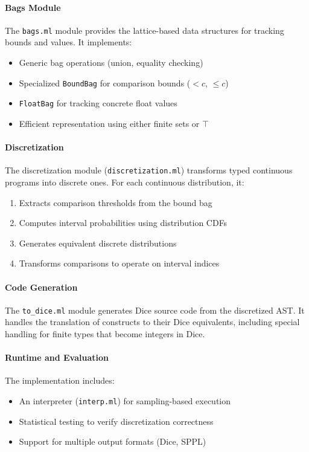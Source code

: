\paragraph{Bags Module} The \texttt{bags.ml} module provides the lattice-based data structures for tracking bounds and values. It implements:
\begin{itemize}
    \item Generic bag operations (union, equality checking)
    \item Specialized \texttt{BoundBag} for comparison bounds ($<c$, $\leq c$)
    \item \texttt{FloatBag} for tracking concrete float values
    \item Efficient representation using either finite sets or $\top$
\end{itemize}

\paragraph{Discretization} The discretization module (\texttt{discretization.ml}) transforms typed continuous programs into discrete ones. For each continuous distribution, it:
\begin{enumerate}
    \item Extracts comparison thresholds from the bound bag
    \item Computes interval probabilities using distribution CDFs
    \item Generates equivalent discrete distributions
    \item Transforms comparisons to operate on interval indices
\end{enumerate}

\paragraph{Code Generation} The \texttt{to\_dice.ml} module generates Dice source code from the discretized AST. It handles the translation of \Slice{} constructs to their Dice equivalents, including special handling for finite types that become integers in Dice.

\paragraph{Runtime and Evaluation} The implementation includes:
\begin{itemize}
    \item An interpreter (\texttt{interp.ml}) for sampling-based execution
    \item Statistical testing to verify discretization correctness
    \item Support for multiple output formats (Dice, SPPL)
\end{itemize}

